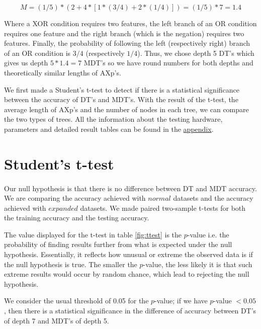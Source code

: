 \documentclass[12pt]{report}
\theoremstyle{definition}
\theoremstyle{definition}
\theoremstyle{definition}
\begin{document}
\[ M = (1/5) * ( 2 + 4 * [ 1 * (3/4) + 2 * (1/4)] ) = (1/5) * 7 = 1.4 \]

Where a XOR condition requires two features, the left branch of an OR condition requires one feature and the right branch (which is the negation) requires two features. Finally, the probability of following the left (respectively right) branch of an OR condition is $3/4$ (respectively $1/4$). Thus, we chose depth 5 DT's which gives us depth $5 * 1.4 = 7$ MDT's so we have round numbers for both depths and theoretically similar lengths of AXp's.

We first made a Student's t-test to detect if there is a statistical significance between the accuracy of DT's and MDT's. With the result of the t-test, the average length of AXp's and the number of nodes in each tree, we can compare the two types of trees. All the information about the testing hardware, parameters and detailed result tables can be found in the \hyperref[chap:appendix]{appendix}.

\newpage

\section{Student's t-test}
\paragraph{} Our null hypothesis is that there is no difference between DT and MDT accuracy. We are comparing the accuracy achieved with $normal$ datasets and the accuracy achieved with $expanded$ datasets. We made paired two-sample t-tests for both the training accuracy and the testing accuracy. 

The value displayed for the t-test in table \ref{fig:ttest} is the $p$-value i.e. the probability of finding results further from what is expected under the null hypothesis. Essentially, it reflects how unusual or extreme the observed data is if the null hypothesis is true. The smaller the $p$-value, the less likely it is that such extreme results would occur by random chance, which lead to rejecting the null hypothesis. 

We consider the usual threshold of 0.05 for the $p$-value; if we have $p$-value $< 0.05$, then there is a statistical significance in the difference of accuracy between DT's of depth 7 and MDT's of depth 5.
\end{document}
